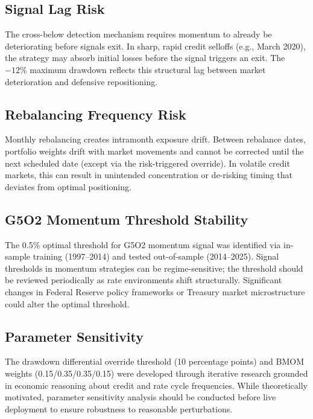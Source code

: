 \documentclass[11pt]{article}
\begin{document}
\subsection{Signal Lag Risk}

The cross-below detection mechanism requires momentum to already be deteriorating before signals exit. In sharp, rapid credit selloffs (e.g., March 2020), the strategy may absorb initial losses before the signal triggers an exit. The $-12\%$ maximum drawdown reflects this structural lag between market deterioration and defensive repositioning.

\subsection{Rebalancing Frequency Risk}

Monthly rebalancing creates intramonth exposure drift. Between rebalance dates, portfolio weights drift with market movements and cannot be corrected until the next scheduled date (except via the risk-triggered override). In volatile credit markets, this can result in unintended concentration or de-risking timing that deviates from optimal positioning.

\subsection{G5O2 Momentum Threshold Stability}

The 0.5\% optimal threshold for G5O2 momentum signal was identified via in-sample training (1997--2014) and tested out-of-sample (2014--2025). Signal thresholds in momentum strategies can be regime-sensitive; the threshold should be reviewed periodically as rate environments shift structurally. Significant changes in Federal Reserve policy frameworks or Treasury market microstructure could alter the optimal threshold.

\subsection{Parameter Sensitivity}

The drawdown differential override threshold (10 percentage points) and BMOM weights (0.15/0.35/0.35/0.15) were developed through iterative research grounded in economic reasoning about credit and rate cycle frequencies. While theoretically motivated, parameter sensitivity analysis should be conducted before live deployment to ensure robustness to reasonable perturbations.
\end{document}
